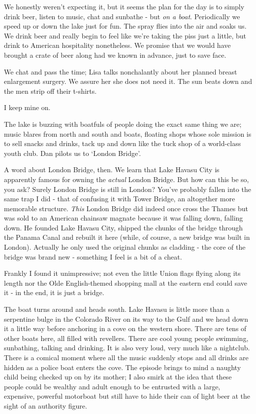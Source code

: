 \documentclass[a5paper,titlepage,draft]{book}
\begin{document}
We honestly weren't expecting it, but it seems the plan for the day is to simply drink beer, listen to music, chat and sunbathe - but \emph{on a boat}.  Periodically we speed up or down the lake just for fun.  The spray flies into the air and soaks us.  We drink beer and really begin to feel like we're taking the piss just a little, but drink to American hospitality nonetheless.  We promise that we would have brought a crate of beer along had we known in advance, just to save face.

We chat and pass the time; Lisa talks nonchalantly about her planned breast enlargement surgery.  We assure her she does not need it.  The sun beats down and the men strip off their t-shirts.

I keep mine on.

The lake is buzzing with boatfuls of people doing the exact same thing we are; music blares from north and south and boats, floating shops whose sole mission is to sell snacks and drinks, tack up and down like the tuck shop of a world-class youth club.  Dan pilots us to `London Bridge'.

A word about London Bridge, then.  We learn that Lake Havasu City is apparently famous for owning the \emph{actual} London Bridge.  But how can this be so, you ask?  Surely London Bridge is still in London?  You've probably fallen into the same trap I did - that of confusing it with Tower Bridge, an altogether more memorable structure.  \emph{This} London Bridge did indeed once cross the Thames but was sold to an American chainsaw magnate because it was falling down, falling down.  He founded Lake Havasu City, shipped the chunks of the bridge through the Panama Canal and rebuilt it here (while, of course, a new bridge was built in London).  Actually he only used the original chunks as cladding - the core of the bridge was brand new - something I feel is a bit of a cheat.

Frankly I found it unimpressive; not even the little Union flags flying along its length nor the Olde English-themed shopping mall at the eastern end could save it - in the end, it is just a bridge.

The boat turns around and heads south.  Lake Havasu is little more than a serpentine bulge in the Colorado River on its way to the Gulf and we head down it a little way before anchoring in a cove on the western shore.  There are tens of other boats here, all filled with revellers.  There are cool young people swimming, sunbathing, talking and drinking.  It is also very loud, very much like a nightclub.  There is a comical moment where all the music suddenly stops and all drinks are hidden as a police boat enters the cove.  The episode brings to mind a naughty child being checked up on by its mother; I also smirk at the idea that these people could be wealthy and adult enough to be entrusted with a large, expensive, powerful motorboat but still have to hide their can of light beer at the sight of an authority figure.
\end{document}
